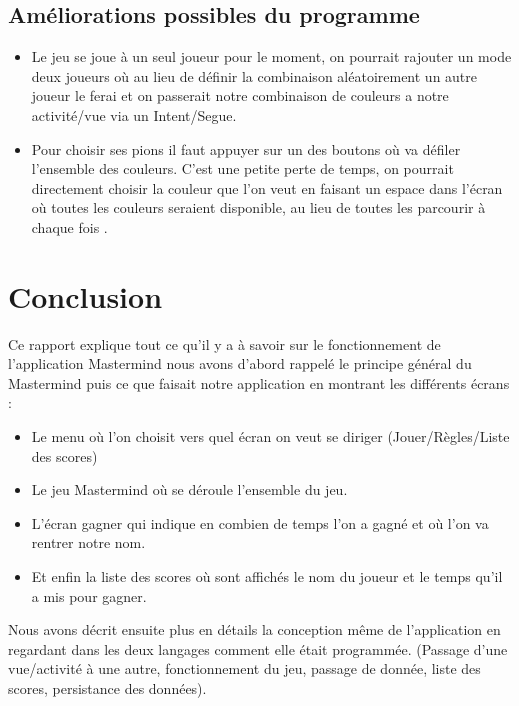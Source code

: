 \documentclass{article}
\begin{document}
\subsection{Améliorations possibles du programme}

\begin{itemize}
\item Le jeu se joue à un seul joueur pour le moment, on pourrait rajouter un mode deux joueurs où au lieu de définir la combinaison aléatoirement un autre joueur le ferai et on passerait notre combinaison de couleurs a notre activité/vue via un Intent/Segue.
\item Pour choisir ses pions il faut appuyer sur un des boutons où va défiler l'ensemble des couleurs. C'est une petite perte de temps, on pourrait directement choisir la couleur que l'on veut en faisant un espace dans l'écran où toutes les couleurs seraient disponible, au lieu de toutes les parcourir à chaque fois .
 
\end{itemize}

\section{Conclusion}
Ce rapport explique tout ce qu'il y a à savoir sur le fonctionnement de l’application Mastermind nous avons d'abord rappelé le principe général du Mastermind puis ce que faisait notre application en montrant les différents écrans : 
\begin{itemize}
\item Le menu où l'on choisit vers quel écran on veut se diriger (Jouer/Règles/Liste des scores)
\item Le jeu Mastermind où se déroule l'ensemble du jeu.
\item L'écran gagner qui indique en combien de temps l'on a gagné et où l'on va rentrer notre nom.
\item Et enfin la liste des scores où sont affichés le nom du joueur et le temps qu'il a mis pour gagner. 

\end{itemize}

Nous avons décrit ensuite plus en détails la conception même de l'application en regardant dans les deux langages comment elle était programmée. (Passage d'une vue/activité à une autre, fonctionnement du jeu, passage de donnée, liste des scores, persistance des données).





\nocite{AndroidDOc}
\nocite{Appledoc}
\nocite{swiftdoc}
\nocite{roundButtonAndroid}
\nocite{roundButtonIOS}
\nocite{addsubViewIOS}
\nocite{tableLayoutAndroid}
\nocite{tableLayoutAndroidprog}
\nocite{Intentandroid}
\nocite{UIButton}
\nocite{shapeAndroid}
\nocite{SegueViewController}
\nocite{chronometerAndroid}
\nocite{UITableview}
\nocite{LIstView}
\nocite{database}
\end{document}
